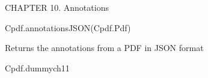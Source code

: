 CHAPTER 10. Annotations

Cpdf.annotationsJSON(Cpdf.Pdf)


Returns the annotations from a PDF in JSON format


Cpdf.dummych11

